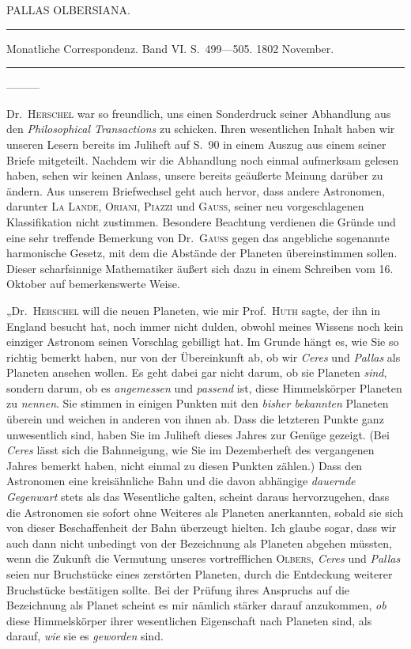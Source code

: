 \bigskip{}
\begin{center}
PALLAS OLBERSIANA.\par
\medskip\hrule\medskip
Monatliche Correspondenz. Band VI. S.\ 499—505. 1802 November.\par
\medskip\hrule
\end{center}\medskip
—\quad —\quad —

Dr.\ \textsc{Herschel} war so freundlich, uns einen Sonderdruck seiner Abhandlung aus den \textit{Philosophical Transactions} zu schicken. Ihren wesentlichen Inhalt haben wir unseren Lesern bereits im Juliheft auf S.\ 90 in einem Auszug aus einem seiner Briefe mitgeteilt. Nachdem wir die Abhandlung noch einmal aufmerksam gelesen haben, sehen wir keinen Anlass, unsere bereits geäußerte Meinung darüber zu ändern. Aus unserem Briefwechsel geht auch hervor, dass andere Astronomen, darunter \textsc{La Lande}, \textsc{Oriani}, \textsc{Piazzi} und \textsc{Gauß}, seiner neu vorgeschlagenen Klassifikation nicht zustimmen. Besondere Beachtung verdienen die Gründe und eine sehr treffende Bemerkung von Dr.\ \textsc{Gauß} gegen das angebliche sogenannte harmonische Gesetz, mit dem die Abstände der Planeten übereinstimmen sollen. Dieser scharfsinnige Mathematiker äußert sich dazu in einem Schreiben vom 16. Oktober auf bemerkenswerte Weise.

„Dr.\ \textsc{Herschel} will die neuen Planeten, wie mir Prof.\ \textsc{Huth} sagte, der ihn in England besucht hat, noch immer nicht dulden, obwohl meines Wissens noch kein einziger Astronom seinen Vorschlag gebilligt hat. Im Grunde hängt es, wie Sie so richtig bemerkt haben, nur von der Übereinkunft ab, ob wir \textit{Ceres} und \textit{Pallas} als Planeten ansehen wollen. Es geht dabei gar nicht darum, ob sie Planeten \textit{sind}, sondern darum, ob es \textit{angemessen} und \textit{passend} ist, diese Himmelskörper Planeten zu \textit{nennen}. Sie stimmen in einigen Punkten mit den \textit{bisher bekannten} Planeten überein und weichen in anderen von ihnen ab. Dass die letzteren Punkte ganz unwesentlich sind, haben Sie im Juliheft dieses Jahres zur Genüge gezeigt. (Bei \textit{Ceres} lässt sich die Bahnneigung, wie Sie im Dezemberheft des vergangenen Jahres bemerkt haben, nicht einmal zu diesen Punkten zählen.) Dass den Astronomen eine kreisähnliche Bahn und die davon abhängige \textit{dauernde Gegenwart} stets als das Wesentliche galten, scheint daraus hervorzugehen, dass
%
die Astronomen sie sofort ohne Weiteres als Planeten anerkannten, sobald sie sich von dieser Beschaffenheit der Bahn überzeugt hielten. Ich glaube sogar, dass wir auch dann nicht unbedingt von der Bezeichnung als Planeten abgehen müssten, wenn die Zukunft die Vermutung unseres vortrefflichen \textsc{Olbers}, \textit{Ceres} und \textit{Pallas} seien nur Bruchstücke eines zerstörten Planeten, durch die Entdeckung weiterer Bruchstücke bestätigen sollte. Bei der Prüfung ihres Anspruchs auf die Bezeichnung als Planet scheint es mir nämlich stärker darauf anzukommen, \textit{ob} diese Himmelskörper ihrer wesentlichen Eigenschaft nach Planeten sind, als darauf, \textit{wie} sie es \textit{geworden} sind.

